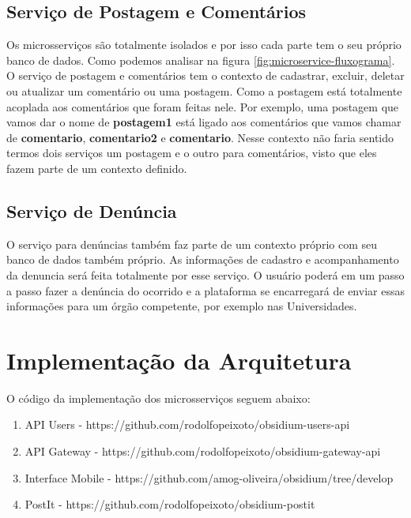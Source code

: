 \subsection{Serviço de Postagem e Comentários}

Os microsserviços são totalmente isolados e por isso cada parte tem o seu próprio banco de dados. Como podemos analisar na figura \ref{fig:microservice-fluxograma}. O serviço de postagem e comentários tem o contexto de cadastrar, excluir, deletar ou atualizar um comentário ou uma postagem. Como a postagem está totalmente acoplada aos comentários que foram feitas nele. Por exemplo, uma postagem que vamos dar o nome de \textbf{postagem1} está ligado aos comentários que vamos chamar de \textbf{comentario}, \textbf{comentario2} e \textbf{comentario}. Nesse contexto não faria sentido termos dois serviços um postagem e o outro para comentários, visto que eles fazem parte de um contexto definido.

\subsection{Serviço de Denúncia}

O serviço para denúncias também faz parte de um contexto próprio com seu banco de dados também próprio. As informações de cadastro e acompanhamento da denuncia será feita totalmente por esse serviço. O usuário poderá em um passo a passo fazer a denúncia do ocorrido e a plataforma se encarregará de enviar essas informações para um órgão competente, por exemplo nas Universidades.


\section{Implementação da Arquitetura}

O código da implementação dos microsserviços seguem abaixo:


\begin{enumerate}
    \item API Users - https://github.com/rodolfopeixoto/obsidium-users-api
    \item API Gateway - https://github.com/rodolfopeixoto/obsidium-gateway-api
    \item Interface Mobile - https://github.com/amog-oliveira/obsidium/tree/develop
    \item PostIt - https://github.com/rodolfopeixoto/obsidium-postit
\end{enumerate}


